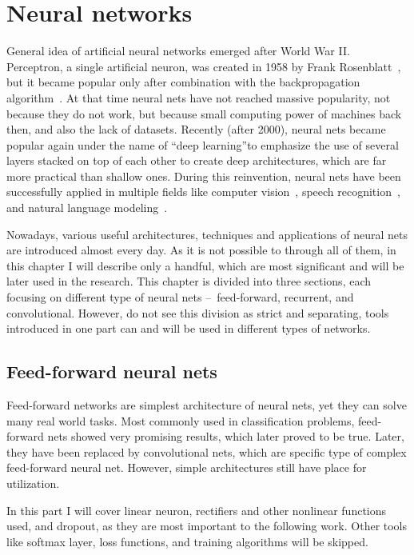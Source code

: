 \chapter{Neural networks} \label{chp:nn}
General idea of artificial neural networks emerged after World War II. Perceptron, a single artificial neuron, was created in 1958 by Frank Rosenblatt~\cite{rosenblatt58a}, but it became popular only after combination with the backpropagation algorithm~\cite{bryson1975applied,werbos1974beyond}. At that time neural nets have not reached massive popularity, not because they do not work, but because small computing power of machines back then, and also the lack of datasets. Recently (after 2000), neural nets became popular again under the name of \textquotedblleft deep learning\textquotedblright to emphasize the use of several layers stacked on top of each other to create deep architectures, which are far more practical than shallow ones. During this reinvention, neural nets have been successfully applied in multiple fields like computer vision~\cite{DBLP:journals/corr/HeZRS15}, speech recognition~\cite{DBLP:journals/corr/abs-1303-5778}, and natural language modeling~\cite{DBLP:conf/interspeech/MikolovKBCK10}.

Nowadays, various useful architectures, techniques and applications of neural nets are introduced almost every day. As it is not possible to through all of them, in this chapter I will describe only a handful, which are most significant and will be later used in the research. This chapter is divided into three sections, each focusing on different type of neural nets --~feed-forward, recurrent, and convolutional. However, do not see this division as strict and separating, tools introduced in one part can and will be used in different types of networks.

\section{Feed-forward neural nets}

Feed-forward networks are simplest architecture of neural nets, yet they can solve many real world tasks. Most commonly used in classification problems, feed-forward nets showed very promising results, which later proved to be true. Later, they have been replaced by convolutional nets, which are specific type of complex feed-forward neural net. However, simple architectures still have place for utilization.

In this part I will cover linear neuron, rectifiers and other nonlinear functions used, and dropout, as they are most important to the following work. Other tools like softmax layer, loss functions, and training algorithms will be skipped. %

